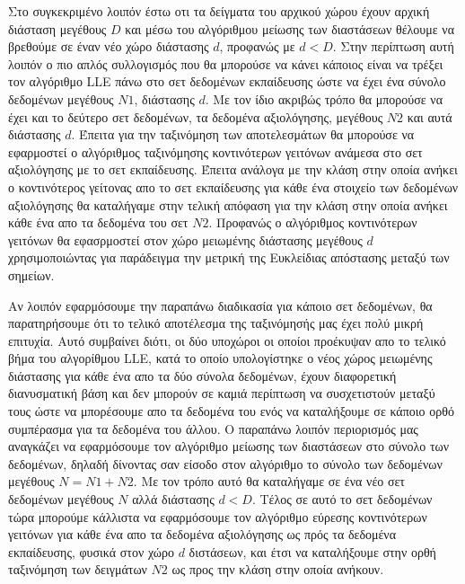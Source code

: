 \par
Στο συγκεκριμένο λοιπόν έστω οτι τα δείγματα του αρχικού χώρου έχουν αρχική διάσταση μεγέθους $D$ και μέσω του αλγόριθμου μείωσης των διαστάσεων θέλουμε να βρεθούμε σε έναν νέο χώρο διάστασης $d$, προφανώς με $d < D$. Στην περίπτωση αυτή λοιπόν ο πιο απλός συλλογισμός που θα μπορούσε να κάνει κάποιος είναι να τρέξει τον αλγόριθμο \textlatin{LLE} πάνω στο σετ δεδομένων εκπαίδευσης ώστε να έχει ένα σύνολο δεδομένων μεγέθους $Ν1$, διάστασης $d$. Με τον ίδιο ακριβώς τρόπο θα μπορούσε να έχει και το δεύτερο σετ δεδομένων, τα δεδομένα αξιολόγησης, μεγέθους $N2$ και αυτά διάστασης $d$. Έπειτα για την ταξινόμηση των αποτελεσμάτων θα μπορούσε να εφαρμοστεί ο αλγόριθμος ταξινόμησης κοντινότερων γειτόνων ανάμεσα στο σετ αξιολόγησης με το σετ εκπαίδευσης. Έπειτα ανάλογα με την κλάση στην οποία ανήκει ο κοντινότερος γείτονας απο το σετ εκπαίδευσης για κάθε ένα στοιχείο των δεδομένων αξιολόγησης θα καταλήγαμε στην τελική απόφαση για την κλάση στην οποία ανήκει κάθε ένα απο τα δεδομένα του σετ $N2$. Προφανώς ο αλγόριθμος κοντινότερων γειτόνων θα εφασρμοστεί στον χώρο μειωμένης διάστασης μεγέθους $d$ χρησιμοποιώντας για παράδειγμα την μετρική της Ευκλείδιας απόστασης μεταξύ των σημείων.
\par
Αν λοιπόν εφαρμόσουμε την παραπάνω διαδικασία για κάποιο σετ δεδομένων, θα παρατηρήσουμε ότι το τελικό αποτέλεσμα της ταξινόμησής μας έχει πολύ μικρή επιτυχία. Αυτό συμβαίνει διότι, οι δύο υποχώροι οι οποίοι προέκυψαν απο το τελικό βήμα του αλγορίθμου \textlatin{LLE}, κατά το οποίο υπολογίστηκε ο νέος χώρος μειωμένης διάστασης για κάθε ένα απο τα δύο σύνολα δεδομένων, έχουν διαφορετική διανυσματική βάση και δεν μπορούν σε καμιά περίπτωση να συσχετιστούν μεταξύ τους ώστε να μπορέσουμε απο τα δεδομένα του ενός να καταλήξουμε σε κάποιο ορθό συμπέρασμα για τα δεδομένα του άλλου. Ο παραπάνω λοιπόν περιορισμός μας αναγκάζει να εφαρμόσουμε τον αλγόριθμο μείωσης των διαστάσεων στο σύνολο των δεδομένων, δηλαδή δίνοντας σαν είσοδο στον αλγόριθμο το σύνολο των δεδομένων μεγέθους $N = N1+N2$. Με τον τρόπο αυτό θα καταλήγαμε σε ένα νέο σετ δεδομένων μεγέθους $N$ αλλά διάστασης $d < D$. Τέλος σε αυτό το σετ δεδομένων τώρα μπορούμε κάλλιστα να εφαρμόσουμε τον αλγόριθμο εύρεσης κοντινότερων γειτόνων για κάθε ένα απο τα δεδομένα αξιολόγησης ως πρός τα δεδομένα εκπαίδευσης, φυσικά στον χώρο $d$ διστάσεων, και έτσι να καταλήξουμε στην ορθή ταξινόμηση των δειγμάτων $N2$ ως προς την κλάση στην οποία ανήκουν. 

